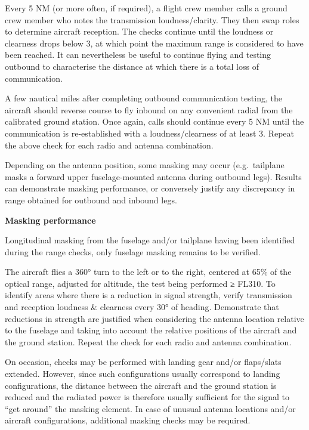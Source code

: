 \documentclass[
]{book}
\begin{document}
Every 5 NM (or more often, if required), a flight crew member calls a ground
crew member who notes the transmission loudness/clarity. They then swap roles
to determine aircraft reception. The checks continue until the loudness or
clearness drops below 3, at which point the maximum range is considered to have
been reached. It can nevertheless be useful to continue flying and testing
outbound to characterise the distance at which there is a total loss of
communication.

A few nautical miles after completing outbound communication testing, the
aircraft should reverse course to fly inbound on any convenient radial from the
calibrated ground station. Once again, calls should continue every 5 NM until
the communication is re-established with a loudness/clearness of at least 3.
Repeat the above check for each radio and antenna combination.

Depending on the antenna position, some masking may occur (e.g.~tailplane masks
a forward upper fuselage-mounted antenna during outbound legs). Results can
demonstrate masking performance, or conversely justify any discrepancy in range
obtained for outbound and inbound legs.

\textbf{Masking performance}

Longitudinal masking from the fuselage and/or tailplane having been identified
during the range checks, only fuselage masking remains to be verified.

The aircraft flies a 360° turn to the left or to the right, centered at 65\% of
the optical range, adjusted for altitude, the test being performed ≥ FL310. To
identify areas where there is a reduction in signal strength, verify
transmission and reception loudness \& clearness every 30° of heading.
Demonstrate that reductions in strength are justified when considering the
antenna location relative to the fuselage and taking into account the relative
positions of the aircraft and the ground station. Repeat the check for each
radio and antenna combination.

On occasion, checks may be performed with landing gear and/or flaps/slats
extended. However, since such configurations usually correspond to landing
configurations, the distance between the aircraft and the ground station is
reduced and the radiated power is therefore usually sufficient for the signal
to ``get around'' the masking element. In case of unusual antenna locations
and/or aircraft configurations, additional masking checks may be required.
\end{document}
